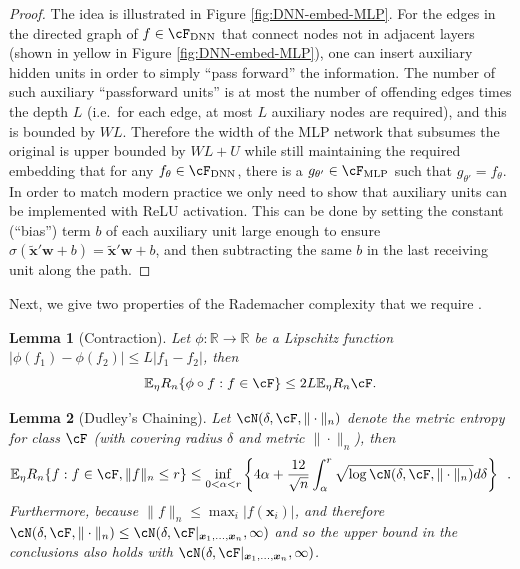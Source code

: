 \documentclass[11pt]{article}
\newtheorem{lemma}{Lemma}
\numberwithin{equation}{section}
\theoremstyle{definition}
\newcommand{\E}{\mathbb{E}}
\newcommand{\R}{\mathbb{R}}
\newcommand{\bw}{\bm{w}}
\newcommand{\bx}{\bm{x}}
\begin{document}
\begin{appendices}
\begin{proof}
	The idea is illustrated in Figure \ref{fig:DNN-embed-MLP}. For the edges in the directed graph of $f \in \cF_{\rm DNN}$ that connect nodes not in adjacent layers (shown in yellow in Figure \ref{fig:DNN-embed-MLP}), one can insert auxiliary hidden units in order to simply ``pass forward'' the information. 
	The number of such auxiliary ``passforward units'' is at most the number of offending edges times the depth $L$ (i.e.\ for each edge, at most $L$ auxiliary nodes are required), and this is bounded by $W L$. Therefore the width of the MLP network that subsumes the original is upper bounded by $W L + U$ while still maintaining the required embedding that for any $f_\theta \in \cF_{\rm DNN}$, there is a $g_{\theta'} \in \cF_{\rm MLP}$ such that $g_{\theta'} = f_{\theta}$. In order to match modern practice we only need to show that auxiliary units can be implemented with ReLU activation. This can be done by setting the constant (``bias'') term $b$ of each auxiliary unit large enough to ensure $\sigma(\tilde{\bx}'\bw + b) = \tilde{\bx}'\bw + b$, and then subtracting the same $b$ in the last receiving unit along the path. 
\end{proof}




Next, we give two properties of the Rademacher complexity that we require \cite[see][]{mendelson2003few}.
\begin{lemma}[Contraction]
	\label{lem:contraction}
		Let $\phi: \R \rightarrow \R$ be a Lipschitz function $|\phi(f_1) - \phi(f_2)| \leq L |f_1 - f_2|$, then
		\[
			\E_\eta R_n \{ \phi \circ f: f \in \cF \} \leq 2 L \E_\eta R_n \cF.
		\]
\end{lemma}



\begin{lemma}[Dudley's Chaining]
	\label{lem:dudley-chaining}
	Let $\cN(\delta, \cF, \| \cdot\|_n)$ denote the metric entropy for class $\cF$ (with covering radius $\delta$ and metric $\| \cdot \|_n$), then
	\[
		\E_\eta R_n \{ f: f \in \cF, \| f \|_n \leq r \} \leq \inf_{0 < \alpha < r} \left\{ 4 \alpha + \frac{12}{\sqrt{n}} \int_\alpha^r \sqrt{\log \cN(\delta, \cF, \| \cdot\|_n) } d\delta  \right\} \enspace.
	\]
	Furthermore, because $\| f \|_n \leq \max_i |f(\bx_i)|$, and therefore $\cN(\delta, \cF, \| \cdot\|_n) \leq \cN(\delta, \cF|_{\bx_1, \ldots, \bx_n}, \infty)$ and so the upper bound in the conclusions also holds with $\cN(\delta, \cF|_{\bx_1, \ldots, \bx_n}, \infty)$.
\end{lemma}





\end{appendices}
\end{document}
